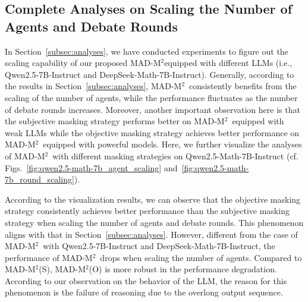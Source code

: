 \documentclass{article} %
\newcommand{\methodname}{MAD-M$^2$}
\theoremstyle{plain}
\begin{document}
\subsection{Complete Analyses on Scaling the Number of Agents and Debate Rounds}\label{appendix:scaling_analyses}
\vspace{-4pt}
In Section~\ref{subsec:analyses}, we have conducted experiments to figure out the scaling capability of our proposed \methodname equipped with different LLMs (i.e., Qwen2.5-7B-Instruct and DeepSeek-Math-7B-Instruct). Generally, according to the results in Section~\ref{subsec:analyses}, \methodname\ consistently benefits from the scaling of the number of agents, while the performance fluctuates as the number of debate rounds increases. Moreover, another important observation here is that the subjective masking strategy performs better on \methodname\ equipped with weak LLMs while the objective masking strategy achieves better performance on \methodname\ equipped with powerful models. Here, we further visualize the analyses of \methodname\ with different masking strategies on Qwen2.5-Math-7B-Instruct (cf. Figs.~\ref{fig:qwen2.5-math-7b_agent_scaling} and~\ref{fig:qwen2.5-math-7b_round_scaling}).

According to the visualization results, we can observe that the objective masking strategy consistently achieves better performance than the subjective masking strategy when scaling the number of agents and debate rounds. This phenomenon aligns with that in Section~\ref{subsec:analyses}. However, different from the case of \methodname\ with Qwen2.5-7B-Instruct
and DeepSeek-Math-7B-Instruct, the performance of \methodname\ drops when scaling the number of agents. Compared to \methodname (S), \methodname (O) is more robust in the performance degradation. According to our observation on the behavior of the LLM, the reason for this phenomenon is the failure of reasoning due to the overlong output sequence. 
\end{document}
